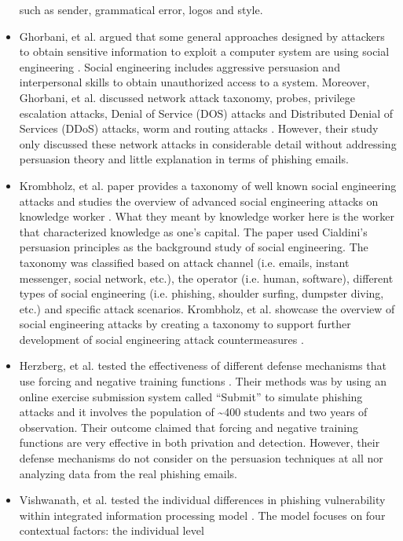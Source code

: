 \begin{itemize}
such as sender, grammatical error, logos and style.
\item Ghorbani, et al. argued that some general approaches designed by attackers
to obtain sensitive information to exploit a computer system are using
social engineering \citep{Ghorbani20101}. Social engineering includes
aggressive persuasion and interpersonal skills to obtain unauthorized
access to a system. Moreover, Ghorbani, et al. discussed network attack
taxonomy, probes, privilege escalation attacks, Denial of Service
(DOS) attacks and Distributed Denial of Services (DDoS) attacks, worm
and routing attacks \citep{Ghorbani20101}. However, their study only
discussed these network attacks in considerable detail without addressing
persuasion theory and little explanation in terms of phishing emails.
\item Krombholz, et al. paper provides a taxonomy of well known social engineering
attacks and studies the overview of advanced social engineering attacks
on knowledge worker \citep{krombholz2013social}. What they meant
by knowledge worker here is the worker that characterized knowledge
as one's capital. The paper used Cialdini's persuasion principles
as the background study of social engineering. The taxonomy was classified
based on attack channel (i.e. emails, instant messenger, social network,
etc.), the operator (i.e. human, software), different types of social
engineering (i.e. phishing, shoulder surfing, dumpster diving, etc.)
and specific attack scenarios. Krombholz, et al. showcase the overview
of social engineering attacks by creating a taxonomy to support further
development of social engineering attack countermeasures \citep{krombholz2013social}. 
\item Herzberg, et al. tested the effectiveness of different defense mechanisms
that use forcing and negative training functions \citep{herzberg2013forcing}.
Their methods was by using an online exercise submission system called
``Submit'' to simulate phishing attacks and it involves the population
of \textasciitilde{}400 students and two years of observation. Their
outcome claimed that forcing and negative training functions are very
effective in both privation and detection. However, their defense
mechanisms do not consider on the persuasion techniques at all nor
analyzing data from the real phishing emails.
\item Vishwanath, et al. tested the individual differences in phishing vulnerability
within integrated information processing model \citep{vishwanath2011people}.
The model focuses on four contextual factors: the individual level

\end{itemize}

